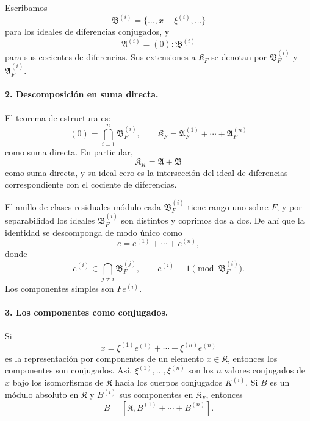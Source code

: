 Escribamos
\[
        \mathfrak B^{(i)}=\{\ldots,x-\xi^{(i)},\ldots\}
\]
para los ideales de diferencias conjugados, y
\[
        \mathfrak A^{(i)}=(0):\mathfrak B^{(i)}
\]
para sus cocientes de diferencias. Sus extensiones a $\mathfrak K_F$ se denotan por $\mathfrak B_F^{(i)}$ y $\mathfrak A_F^{(i)}$.

\paragraph{2. Descomposición en suma directa.}
El teorema de estructura es:
\[
        (0)=\bigcap_{i=1}^n \mathfrak B_F^{(i)},
        \qquad
        \mathfrak K_F=\mathfrak A_F^{(1)}+
        \cdots+\mathfrak A_F^{(n)}
\]
como suma directa. En particular,
\[
        \mathfrak K_K=\mathfrak A+\mathfrak B
\]
como suma directa, y su ideal cero es la intersección del ideal de diferencias correspondiente con el cociente de diferencias.

El anillo de clases residuales módulo cada $\mathfrak B_F^{(i)}$ tiene rango uno sobre $F$, y por separabilidad los ideales $\mathfrak B_F^{(i)}$ son distintos y coprimos dos a dos. De ahí que la identidad se descomponga de modo único como
\[
        e=e^{(1)}+
        \cdots+e^{(n)},
\]
donde
\[
        e^{(i)}\in\bigcap_{j\ne i}\mathfrak B_F^{(j)},
        \qquad
        e^{(i)}\equiv1\pmod {\mathfrak B_F^{(i)}}.
\]
Los componentes simples son $Fe^{(i)}$.

\paragraph{3. Los componentes como conjugados.}
Si
\[
        x=\xi^{(1)}e^{(1)}+
        \cdots+\xi^{(n)}e^{(n)}
\]
es la representación por componentes de un elemento $x\in\mathfrak K$, entonces los componentes son conjugados. Así, $\xi^{(1)},\ldots,\xi^{(n)}$ son los $n$ valores conjugados de $x$ bajo los isomorfismos de $\mathfrak K$ hacia los cuerpos conjugados $K^{(i)}$. Si $B$ es un módulo absoluto en $\mathfrak K$ y $B^{(i)}$ sus componentes en $\mathfrak K_F$, entonces
\[
        B=[\mathfrak K,B^{(1)}+\cdots+B^{(n)}].
\]

